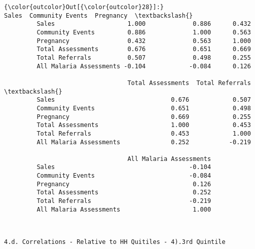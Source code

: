 \documentclass[11pt]{article}
\begin{document}
\begin{Verbatim}[commandchars=\\\{\}]
{\color{outcolor}Out[{\color{outcolor}28}]:}                          Sales  Community Events  Pregnancy  \textbackslash{}
         Sales                    1.000             0.886      0.432   
         Community Events         0.886             1.000      0.563   
         Pregnancy                0.432             0.563      1.000   
         Total Assessments        0.676             0.651      0.669   
         Total Referrals          0.507             0.498      0.255   
         All Malaria Assessments -0.104            -0.084      0.126   
         
                                  Total Assessments  Total Referrals  \textbackslash{}
         Sales                                0.676            0.507   
         Community Events                     0.651            0.498   
         Pregnancy                            0.669            0.255   
         Total Assessments                    1.000            0.453   
         Total Referrals                      0.453            1.000   
         All Malaria Assessments              0.252           -0.219   
         
                                  All Malaria Assessments  
         Sales                                     -0.104  
         Community Events                          -0.084  
         Pregnancy                                  0.126  
         Total Assessments                          0.252  
         Total Referrals                           -0.219  
         All Malaria Assessments                    1.000  
\end{Verbatim}
            
    \begin{Verbatim}[commandchars=\\\{\}]


4.d. Correlations - Relative to HH Quitiles - 4).3rd Quintile

    \end{Verbatim}
\end{document}
